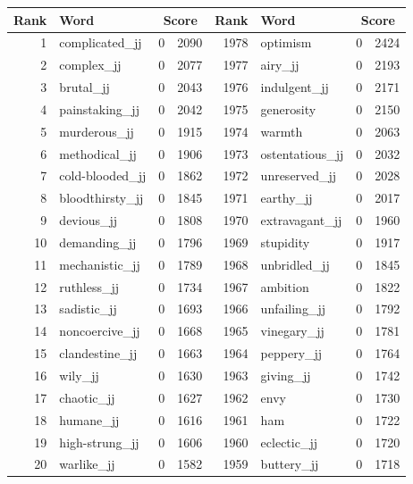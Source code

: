 \begin{table}[tbp]
    \begin{tabular}{| rlr@{.}l | rlr@{.}l |}
    \hline
    \textbf{Rank} & \textbf{Word} & \multicolumn{2}{c|}{\textbf{Score}} & \textbf{Rank} & \textbf{Word} & \multicolumn{2}{c|}{\textbf{Score}} \\
    \hline
    1 & complicated\_jj & 0 & 2090    &    1978 & optimism & 0 & 2424 \\
    2 & complex\_jj & 0 & 2077    &    1977 & airy\_jj & 0 & 2193 \\
    3 & brutal\_jj & 0 & 2043    &    1976 & indulgent\_jj & 0 & 2171 \\
    4 & painstaking\_jj & 0 & 2042    &    1975 & generosity & 0 & 2150 \\
    5 & murderous\_jj & 0 & 1915    &    1974 & warmth & 0 & 2063 \\
    6 & methodical\_jj & 0 & 1906    &    1973 & ostentatious\_jj & 0 & 2032 \\
    7 & cold-blooded\_jj & 0 & 1862    &    1972 & unreserved\_jj & 0 & 2028 \\
    8 & bloodthirsty\_jj & 0 & 1845    &    1971 & earthy\_jj & 0 & 2017 \\
    9 & devious\_jj & 0 & 1808    &    1970 & extravagant\_jj & 0 & 1960 \\
    10 & demanding\_jj & 0 & 1796    &    1969 & stupidity & 0 & 1917 \\
    11 & mechanistic\_jj & 0 & 1789    &    1968 & unbridled\_jj & 0 & 1845 \\
    12 & ruthless\_jj & 0 & 1734    &    1967 & ambition & 0 & 1822 \\
    13 & sadistic\_jj & 0 & 1693    &    1966 & unfailing\_jj & 0 & 1792 \\
    14 & noncoercive\_jj & 0 & 1668    &    1965 & vinegary\_jj & 0 & 1781 \\
    15 & clandestine\_jj & 0 & 1663    &    1964 & peppery\_jj & 0 & 1764 \\
    16 & wily\_jj & 0 & 1630    &    1963 & giving\_jj & 0 & 1742 \\
    17 & chaotic\_jj & 0 & 1627    &    1962 & envy & 0 & 1730 \\
    18 & humane\_jj & 0 & 1616    &    1961 & ham & 0 & 1722 \\
    19 & high-strung\_jj & 0 & 1606    &    1960 & eclectic\_jj & 0 & 1720 \\
    20 & warlike\_jj & 0 & 1582    &    1959 & buttery\_jj & 0 & 1718 \\

\end{tabular}
\end{table}
